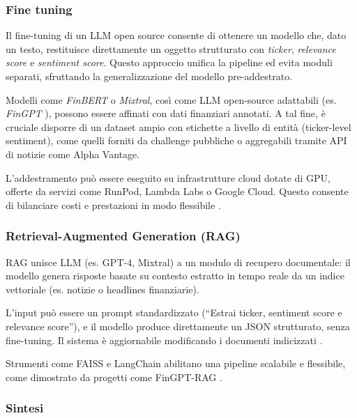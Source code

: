 \documentclass[a4paper,12pt]{article}
\begin{document}
\subsubsection{Fine tuning}

Il fine-tuning di un LLM open source consente di ottenere un modello che, dato un testo, restituisce direttamente un oggetto strutturato con \textit{ticker}, \textit{relevance score} e \textit{sentiment score}. Questo approccio unifica la pipeline ed evita moduli separati, sfruttando la generalizzazione del modello pre-addestrato.


Modelli come \textit{FinBERT} \parencite{araci2019finbert} o \textit{Mixtral}, così come LLM open-source adattabili (es. \textit{FinGPT} \parencite{yang2023fingptopensourcefinanciallarge}), possono essere affinati con dati finanziari annotati. A tal fine, è cruciale disporre di un dataset ampio con etichette a livello di entità (ticker-level sentiment), come quelli forniti da challenge pubbliche \parencite{maia201818} o aggregabili tramite API di notizie come Alpha Vantage.

L’addestramento può essere eseguito su infrastrutture cloud dotate di GPU, offerte da servizi come RunPod, Lambda Labs o Google Cloud. Questo consente di bilanciare costi e prestazioni in modo flessibile \parencite{li2020cloudgpu}.
\subsubsection{Retrieval-Augmented Generation (RAG)}

RAG unisce LLM (es. GPT-4, Mixtral) a un modulo di recupero documentale: il modello genera risposte basate su contesto estratto in tempo reale da un indice vettoriale (es. notizie o headlines finanziarie).

L’input può essere un prompt standardizzato (“Estrai ticker, sentiment score e relevance score”), e il modello produce direttamente un JSON strutturato, senza fine-tuning. Il sistema è aggiornabile modificando i documenti indicizzati \parencite{lewis2020retrieval}.

Strumenti come FAISS e LangChain abilitano una pipeline scalabile e flessibile, come dimostrato da progetti come FinGPT-RAG \parencite{gudibande2023false, yang2023fingptopensourcefinanciallarge}.

\subsubsection{Sintesi}
\end{document}
